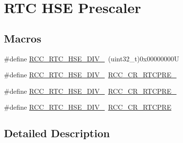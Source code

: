 \hypertarget{group___r_c_c___h_a_l___e_c___r_t_c___h_s_e___d_i_v}{\section{R\-T\-C H\-S\-E Prescaler}
\label{group___r_c_c___h_a_l___e_c___r_t_c___h_s_e___d_i_v}
}
\subsection*{Macros}
\begin{DoxyCompactItemize}
\item 
\#define \hyperlink{group___r_c_c___h_a_l___e_c___r_t_c___h_s_e___d_i_v_ga1f44740a93ee5b2317052cc78bb2e0ed}{R\-C\-C\-\_\-\-R\-T\-C\-\_\-\-H\-S\-E\-\_\-\-D\-I\-V\-\_}~(uint32\-\_\-t)0x00000000\-U
\item 
\#define \hyperlink{group___r_c_c___h_a_l___e_c___r_t_c___h_s_e___d_i_v_ga76211572770fdd4d498693f977123485}{R\-C\-C\-\_\-\-R\-T\-C\-\_\-\-H\-S\-E\-\_\-\-D\-I\-V\-\_}~\hyperlink{group___peripheral___registers___bits___definition_gac9e8d8aa53f0db77f19f0ae4f0a659ff}{R\-C\-C\-\_\-\-C\-R\-\_\-\-R\-T\-C\-P\-R\-E\-\_}
\item 
\#define \hyperlink{group___r_c_c___h_a_l___e_c___r_t_c___h_s_e___d_i_v_gae6c2f7167f7c487aa37fd28dd40e6228}{R\-C\-C\-\_\-\-R\-T\-C\-\_\-\-H\-S\-E\-\_\-\-D\-I\-V\-\_}~\hyperlink{group___peripheral___registers___bits___definition_ga97b08bda72e10784ae37f72f48da6829}{R\-C\-C\-\_\-\-C\-R\-\_\-\-R\-T\-C\-P\-R\-E\-\_}
\item 
\#define \hyperlink{group___r_c_c___h_a_l___e_c___r_t_c___h_s_e___d_i_v_ga60173d5d241b3b64f747672772c6315f}{R\-C\-C\-\_\-\-R\-T\-C\-\_\-\-H\-S\-E\-\_\-\-D\-I\-V\-\_}~\hyperlink{group___peripheral___registers___bits___definition_gaf5cb8ce29ab0c579e788999c96f34db3}{R\-C\-C\-\_\-\-C\-R\-\_\-\-R\-T\-C\-P\-R\-E}
\end{DoxyCompactItemize}


\subsection{Detailed Description}


